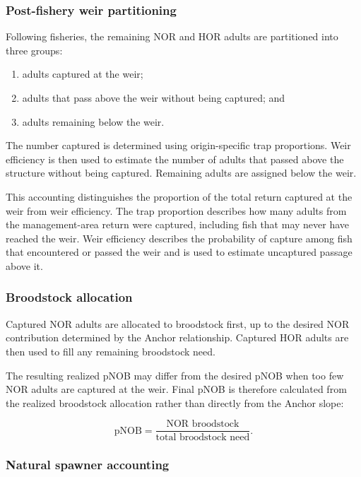 \documentclass[12pt,letterpaper]{article}
\providecommand{\tightlist}{%
  \setlength{\itemsep}{0pt}\setlength{\parskip}{0pt}}
\begin{document}
\subsubsection{Post-fishery weir partitioning}\label{post-fishery-weir-partitioning}

Following fisheries, the remaining NOR and HOR adults are partitioned into three groups:

\begin{enumerate}
\def\labelenumi{\arabic{enumi}.}
\tightlist
\item
  adults captured at the weir;
\item
  adults that pass above the weir without being captured; and
\item
  adults remaining below the weir.
\end{enumerate}

The number captured is determined using origin-specific trap proportions. Weir efficiency is then used to estimate the number of adults that passed above the structure without being captured. Remaining adults are assigned below the weir.

This accounting distinguishes the proportion of the total return captured at the weir from weir efficiency. The trap proportion describes how many adults from the management-area return were captured, including fish that may never have reached the weir. Weir efficiency describes the probability of capture among fish that encountered or passed the weir and is used to estimate uncaptured passage above it.

\subsubsection{Broodstock allocation}\label{broodstock-allocation}

Captured NOR adults are allocated to broodstock first, up to the desired NOR contribution determined by the Anchor relationship. Captured HOR adults are then used to fill any remaining broodstock need.

The resulting realized pNOB may differ from the desired pNOB when too few NOR adults are captured at the weir. Final pNOB is therefore calculated from the realized broodstock allocation rather than directly from the Anchor slope:

\[
\text{pNOB} =
\frac{\text{NOR broodstock}}{\text{total broodstock need}}.
\]

\subsubsection{Natural spawner accounting}\label{natural-spawner-accounting}
\end{document}
